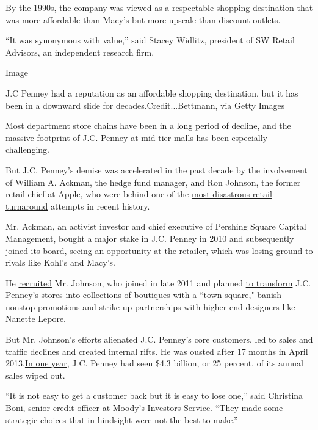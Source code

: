 By the 1990s, the company
\href{https://www.nytimes3xbfgragh.onion/1999/06/26/business/can-jc-penney-evolve-one-minor-problem-darwin-doesn-t-take-rain-checks.html}{was
viewed as a} respectable shopping destination that was more affordable
than Macy's but more upscale than discount outlets.

``It was synonymous with value,'' said Stacey Widlitz, president of SW
Retail Advisors, an independent research firm.

Image

J.C Penney had a reputation as an affordable shopping destination, but
it has been in a downward slide for decades.Credit...Bettmann, via Getty
Images

Most department store chains have been in a long period of decline, and
the massive footprint of J.C. Penney at mid-tier malls has been
especially challenging.

But J.C. Penney's demise was accelerated in the past decade by the
involvement of William A. Ackman, the hedge fund manager, and Ron
Johnson, the former retail chief at Apple, who were behind one of the
\href{https://www.nytimes3xbfgragh.onion/2013/04/09/business/ron-johnson-out-as-jc-penney-chief.html}{most
disastrous retail turnaround} attempts in recent history.

Mr. Ackman, an activist investor and chief executive of Pershing Square
Capital Management, bought a major stake in J.C. Penney in 2010 and
subsequently joined its board, seeing an opportunity at the retailer,
which was losing ground to rivals like Kohl's and Macy's.

He
\href{https://dealbook.nytimes3xbfgragh.onion/2012/11/12/a-dose-of-realism-for-the-chief-of-j-c-penney/}{recruited}
Mr. Johnson, who joined in late 2011 and planned
\href{https://dealbook.nytimes3xbfgragh.onion/2012/11/12/a-dose-of-realism-for-the-chief-of-j-c-penney/}{to
transform} J.C. Penney's stores into collections of boutiques with a
``town square," banish nonstop promotions and strike up partnerships
with higher-end designers like Nanette Lepore.

But Mr. Johnson's efforts alienated J.C. Penney's core customers, led to
sales and traffic declines and created internal rifts. He was ousted
after 17 months in April
2013.\href{https://www.buzzfeednews.com/article/sapna/how-an-overconfident-billionaire-brought-a-111-year-old-reta}{In
one year,} J.C. Penney had seen \$4.3 billion, or 25 percent, of its
annual sales wiped out.

``It is not easy to get a customer back but it is easy to lose one,''
said Christina Boni, senior credit officer at Moody's Investors Service.
``They made some strategic choices that in hindsight were not the best
to make.''

